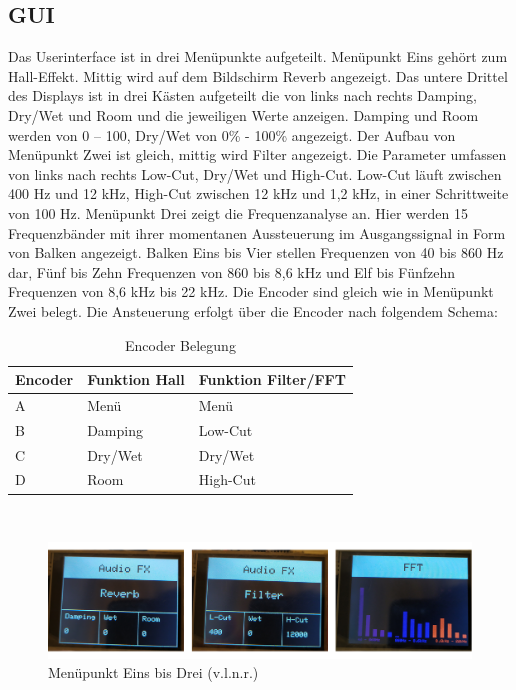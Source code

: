 \documentclass[12pt]{article}
\begin{document}
\subsection{GUI}
Das Userinterface ist in drei Menüpunkte aufgeteilt. Menüpunkt Eins gehört zum Hall-Effekt. Mittig wird auf dem Bildschirm \glq Reverb\grq{}\: angezeigt. 
Das untere Drittel des Displays ist in drei Kästen aufgeteilt die von links nach rechts Damping, Dry/Wet und Room und die jeweiligen Werte anzeigen. 
Damping und Room werden von 0 – 100, Dry/Wet von 0\% - 100\% angezeigt. Der Aufbau von Menüpunkt Zwei ist gleich, mittig wird \glq Filter\grq{}\: angezeigt. 
Die Parameter umfassen von links nach rechts Low-Cut, Dry/Wet und High-Cut. Low-Cut läuft zwischen 400 Hz und 12 kHz, High-Cut zwischen 12 kHz und 1,2 kHz, in einer Schrittweite von 100 Hz. 
Menüpunkt Drei zeigt die Frequenzanalyse an. Hier werden 15 Frequenzbänder mit ihrer momentanen Aussteuerung im Ausgangssignal in Form von Balken angezeigt. Balken Eins bis Vier stellen Frequenzen von 40 bis 860 Hz dar, Fünf bis Zehn Frequenzen von 860 bis 8,6 kHz und Elf bis Fünfzehn Frequenzen von 8,6 kHz bis 22 kHz.
Die Encoder sind gleich wie in Menüpunkt Zwei belegt.
Die Ansteuerung erfolgt über die Encoder nach folgendem Schema:
\begin{table}[h]
    \centering
    \caption{Encoder Belegung}
    \label{tbl:encoderbelegung}
    \begin{tabular}{l|l|l}
      \textbf{Encoder}  & \textbf{Funktion Hall} & \textbf{Funktion Filter/FFT}\\
      \hline
      A & Menü & Menü \\
   
      B & Damping & Low-Cut \\
   
      C & Dry/Wet & Dry/Wet \\
      
      D & Room & High-Cut \\
     

    \end{tabular}    

\end{table}
\\
\begin{figure}[h]
  \centering
  \includegraphics[width=\textwidth]{ITSMenue.jpg}
  \caption{Menüpunkt Eins bis Drei (v.l.n.r.)}
\end{figure}
\newpage
\end{document}
